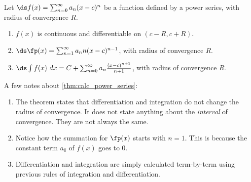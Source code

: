 \begin{theorem}\label{thm:calc_power_series}
Let $\ds f(x) = \sum_{n=0}^\infty a_n(x-c)^n$ be a function defined by a power series, with radius of convergence $R$.
\begin{enumerate}
	\item $f(x)$ is continuous and differentiable on $(c-R,c+R)$.
	\item	$\ds \fp(x) = \sum_{n=1}^\infty a_nn(x-c)^{n-1}$, with radius of convergence $R$.
	\item	$\ds \int f(x)\ dx = C+\sum_{n=0}^\infty a_n\frac{(x-c)^{n+1}}{n+1}$, with radius of convergence $R$.
\end{enumerate}
\end{theorem}

A few notes about \autoref{thm:calc_power_series}:
\begin{enumerate}
	\item The theorem states that differentiation and integration do not change the radius of convergence. It does not state anything about the \emph{interval} of convergence. They are not always the same.
	\item	Notice how the summation for $\fp(x)$ starts with $n=1$. This is because the constant term $a_0$ of $f(x)$ goes to 0.
	\item	Differentiation and integration are simply calculated term-by-term using previous rules of integration and differentiation.
\end{enumerate}

